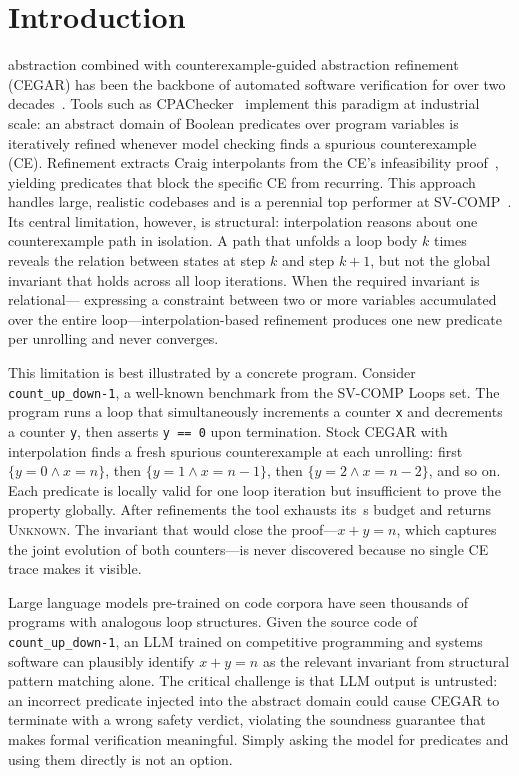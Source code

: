 \section{Introduction}
\label{sec:intro}

 abstraction combined with counterexample-guided abstraction
refinement (CEGAR) has been the backbone of automated software verification for over
two decades~\cite{cegar2003,predabstraction1997,slam2002}. Tools such as
CPAChecker~\cite{cpachecker2011} implement this paradigm at industrial scale: an
abstract domain of Boolean predicates over program variables is iteratively refined
whenever model checking finds a spurious counterexample (CE). Refinement extracts
Craig interpolants from the CE's infeasibility proof~\cite{interpolation2003}, yielding
predicates that block the specific CE from recurring. This approach handles large,
realistic codebases and is a perennial top performer at SV-COMP~\cite{svcomp2022}.
Its central limitation, however, is structural: interpolation reasons about one
counterexample path in isolation. A path that unfolds a loop body $k$ times reveals
the relation between states at step $k$ and step $k+1$, but not the global invariant
that holds across all loop iterations. When the required invariant is relational---
expressing a constraint between two or more variables accumulated over the entire
loop---interpolation-based refinement produces one new predicate per unrolling and
never converges.

This limitation is best illustrated by a concrete program. Consider
\texttt{count\_up\_down-1}, a well-known benchmark from the SV-COMP Loops set. The
program runs a loop that simultaneously increments a counter \texttt{x} and decrements
a counter \texttt{y}, then asserts \texttt{y == 0} upon termination. Stock CEGAR
with interpolation finds a fresh spurious counterexample at each unrolling: first
$\{y = 0 \wedge x = n\}$, then $\{y = 1 \wedge x = n - 1\}$, then
$\{y = 2 \wedge x = n - 2\}$, and so on. Each predicate is locally valid for
one loop iteration but insufficient to prove the property globally.
After \CUDStockRefs{} refinements the tool exhausts its \CUDStockWall{}\,s budget
and returns \textsc{Unknown}. The invariant that would close the proof---$x + y = n$,
which captures the joint evolution of both counters---is never discovered because no
single CE trace makes it visible.

Large language models pre-trained on code corpora have seen thousands of programs with
analogous loop structures. Given the source code of \texttt{count\_up\_down-1}, an LLM
trained on competitive programming and systems software can plausibly identify $x + y = n$
as the relevant invariant from structural pattern matching alone. The critical challenge
is that LLM output is untrusted: an incorrect predicate injected into the abstract
domain could cause CEGAR to terminate with a wrong safety verdict, violating the
soundness guarantee that makes formal verification meaningful. Simply asking the model
for predicates and using them directly is not an option.

